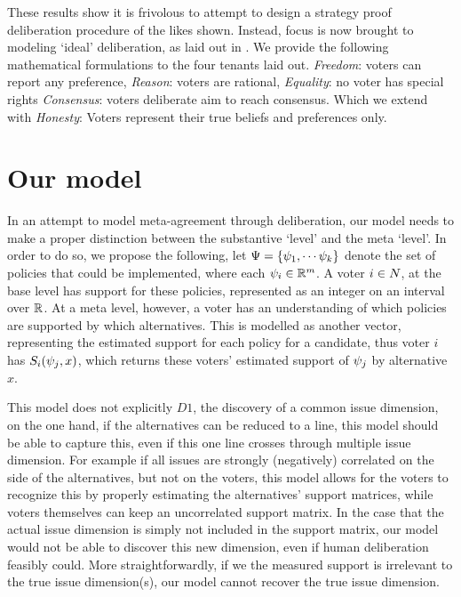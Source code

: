 These results show it is frivolous to attempt to design a strategy proof deliberation procedure of the likes shown. Instead, focus is now brought to modeling `ideal' deliberation, as laid out in . We provide the following mathematical formulations to the four tenants laid out. \emph{Freedom}: voters can report any preference, \emph{Reason}: voters are rational, \emph{Equality}: no voter has special rights \emph{Consensus}:  voters deliberate aim to reach consensus. Which we extend with \emph{Honesty}: Voters represent their true beliefs and preferences only.


\section{Our model}
\label{sec: main model}

In an attempt to model meta-agreement through deliberation, our model needs to make a proper distinction between the substantive `level' and the meta `level'. In order to do so, we propose the following, let \(\Psi = \{\psi_{1}, \cdots \psi_{k}\}\) denote the set of policies that could be implemented, where each $\psi_i \in \mathbb{R}^{m}$. A voter $i \in N$, at the base level has support for these policies, represented as an integer on an interval over $\mathbb{R}$. At a meta level, however, a voter has an understanding of which policies are supported by which alternatives. This is modelled as another vector, representing the estimated support for each policy for a candidate, thus voter $i$ has $S_i(\psi_j, x)$, which returns these voters' estimated support of $\psi_j$ by alternative $x$.

This model does not explicitly $D1$, the discovery of a common issue dimension, on the one hand, if the alternatives can be reduced to a line, this model should be able to capture this, even if this one line crosses through multiple issue dimension. For example if all issues are strongly (negatively) correlated on the side of the alternatives, but not on the voters, this model allows for the voters to recognize this by properly estimating the alternatives' support matrices, while voters themselves can keep an uncorrelated support matrix. In the case that the actual issue dimension is simply not included in the support matrix, our model would not be able to discover this new dimension, even if human deliberation feasibly could. More straightforwardly, if we the measured support is irrelevant to the true issue dimension(s), our model cannot recover the true issue dimension.

